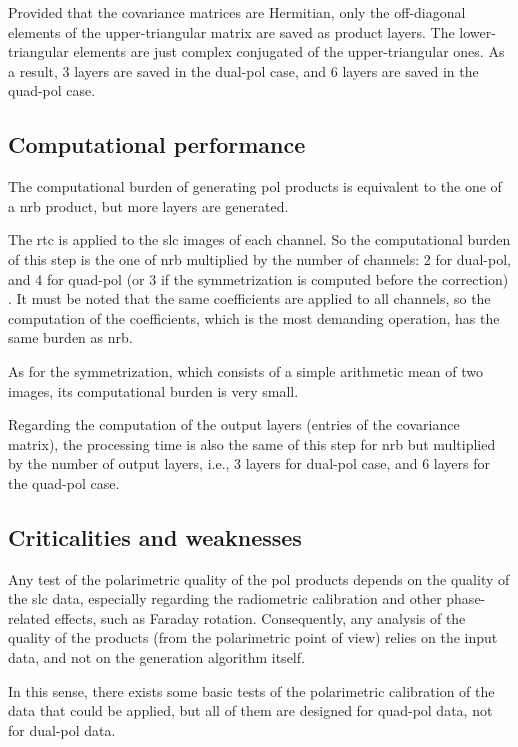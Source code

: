 Provided that the covariance matrices are Hermitian, only the off-diagonal elements of the upper-triangular matrix are saved as product layers. The lower-triangular elements are just complex conjugated of the upper-triangular ones. As a result, 3 layers are saved in the dual-pol case, and 6 layers are saved in the quad-pol case.

\subsection{Computational performance}
\label{sec:pol_computation}

The computational burden of generating \acs{pol} products is equivalent to the one of a \acs{nrb} product, but more layers are generated.

The \acs{rtc} is applied to the \acs{slc} images of each channel. So the computational burden of this step is the one of \acs{nrb} multiplied by the number of channels: 2 for dual-pol, and 4 for quad-pol (or 3 if the symmetrization is computed before the correction) . It must be noted that the same coefficients are applied to all channels, so the computation of the coefficients, which is the most demanding operation, has the same burden as \acs{nrb}.

As for the symmetrization, which consists of a simple arithmetic mean of two images, its computational burden is very small.

Regarding the computation of the output layers (entries of the covariance matrix), the processing time is also the same of this step for \acs{nrb} but multiplied by the number of output layers, i.e., 3 layers for dual-pol case, and 6 layers for the quad-pol case.



\subsection{Criticalities and weaknesses}
\label{sec:pol_criticalities}

Any test of the polarimetric quality of the \acs{pol} products depends on the quality of the \acs{slc} data, especially regarding the radiometric calibration and other phase-related effects, such as Faraday rotation. 
Consequently, any analysis of the quality of the products (from the polarimetric point of view) relies on the input data, and not on the generation algorithm itself.

In this sense, there exists some basic tests of the polarimetric calibration of the data that could be applied, but all of them are designed for quad-pol data, not for dual-pol data.

